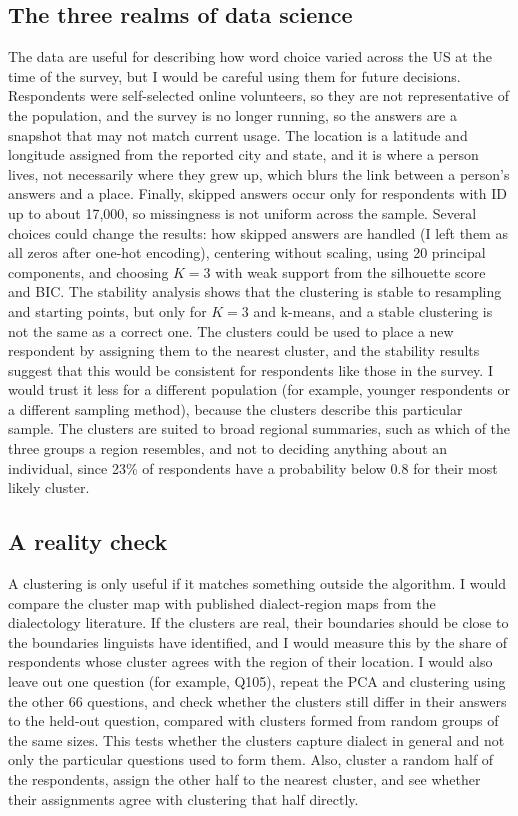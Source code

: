 \documentclass[10pt,letterpaper]{article}
\begin{document}
\subsection{The three realms of data science}

 The data are useful for describing how word choice varied across the US at the time of the survey, but I would be careful using them for future decisions. Respondents were self-selected online volunteers, so they are not representative of the population, and the survey is no longer running, so the answers are a snapshot that may not match current usage. The location is a latitude and longitude assigned from the reported city and state, and it is where a person lives, not necessarily where they grew up, which blurs the link between a person's answers and a place. Finally, skipped answers occur only for respondents with ID up to about 17{,}000, so missingness is not uniform across the sample.  Several choices could change the results: how skipped answers are handled (I left them as all zeros after one-hot encoding), centering without scaling, using 20 principal components, and choosing $K = 3$ with weak support from the silhouette score and BIC. The stability analysis shows that the clustering is stable to resampling and starting points, but only for $K = 3$ and k-means, and a stable clustering is not the same as a correct one. The clusters could be used to place a new respondent by assigning them to the nearest cluster, and the stability results suggest that this would be consistent for respondents like those in the survey. I would trust it less for a different population (for example, younger respondents or a different sampling method), because the clusters describe this particular sample. The clusters are suited to broad regional summaries, such as which of the three groups a region resembles, and not to deciding anything about an individual, since 23\% of respondents have a probability below 0.8 for their most likely cluster.

\subsection{A reality check}

A clustering is only useful if it matches something outside the algorithm. I would compare the cluster map with published dialect-region maps from the dialectology literature. If the clusters are real, their boundaries should be close to the boundaries linguists have identified, and I would measure this by the share of respondents whose cluster agrees with the region of their location. I would also leave out one question (for example, Q105), repeat the PCA and clustering using the other 66 questions, and check whether the clusters still differ in their answers to the held-out question, compared with clusters formed from random groups of the same sizes. This tests whether the clusters capture dialect in general and not only the particular questions used to form them. Also, cluster a random half of the respondents, assign the other half to the nearest cluster, and see whether their assignments agree with clustering that half directly.
\end{document}
